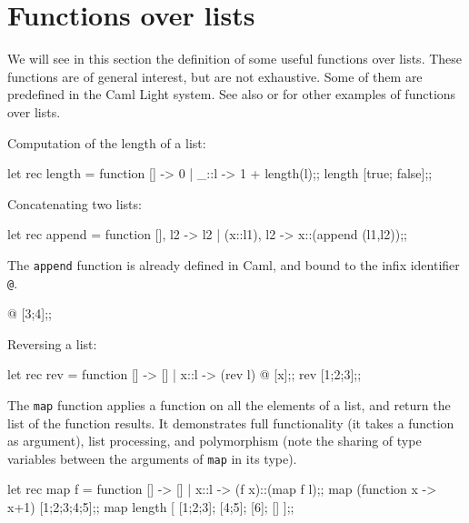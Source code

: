 \section{Functions over lists}


We will see in this section the definition of some useful functions
over lists. These functions are of general interest, but are not
exhaustive. Some of them are predefined in the Caml Light system.
See also \cite{CAMLPrimer} or \cite{CAMLRefMan} for other examples of
functions over lists.

Computation of the length of a list:
\begin{caml_example}
let rec length = function [] -> 0
                        | _::l -> 1 + length(l);;
length [true; false];;
\end{caml_example}
Concatenating two lists:
\begin{caml_example}
let rec append =
     function [], l2 -> l2
            | (x::l1), l2 -> x::(append (l1,l2));;
\end{caml_example}
The \verb"append" function is already defined in Caml, and bound to the
infix identifier \verb"@".
\begin{caml_example}
[1;2] @ [3;4];;
\end{caml_example}
Reversing a list:
\begin{caml_example}
let rec rev = function [] -> []
                     | x::l -> (rev l) @ [x];;
rev [1;2;3];;
\end{caml_example}

The \verb"map" function applies a function on all the elements
of a list, and return the list of the function results. It
demonstrates full functionality (it takes a function
as argument), list processing, and polymorphism (note the sharing of type
variables between the arguments of \verb"map" in its type).
\begin{caml_example}
let rec map f =
    function [] -> []
           | x::l -> (f x)::(map f l);;
map (function x -> x+1) [1;2;3;4;5];;
map length [ [1;2;3]; [4;5]; [6]; [] ];;
\end{caml_example}



